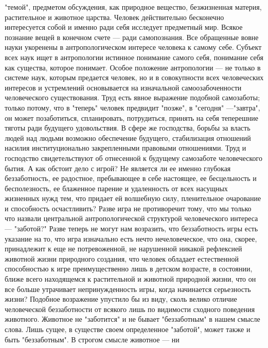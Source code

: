 \documentclass[12pt]{article}
\begin{document}
"темой", предметом обсуждения, как природное вещество, безжизненная материя, растительное и животное  
царства. Человек действительно бесконечно интересуется собой и именно ради себя исследует предметный мир.
Всякое познание вещей в конечном счете --- ради самопознания. Все обращенные вовне науки укоренены в
антропологическом  интересе  человека  к  самому  себе.  Субъект  всех  наук  ищет  в  антропологии  истинное
понимание самого себя, понимание себя как существа, которое понимает. Особое положение антропологии --- не
только  в  системе  наук,  которым  предается  человек,  но  и  в  совокупности  всех  человеческих  интересов  и
устремлений основывается на изначальной самоозабоченности человеческого существования. Труд есть явное
выражение подобной самозаботы; только потому, что в "теперь" человек предвидит "позже", в "сегодня" ---"завтра", он может позаботиться, спланировать, потрудиться, принять на себя теперешние тяготы ради будущего
удовольствия. В сфере же господства, борьбы за власть людей над людьми возможно обеспечение будущего,
стабилизация  отношений  насилия  институционально  закрепленными  правовыми  отношениями.  Труд  и
господство свидетельствуют об отнесенной к будущему самозаботе человеческого бытия.
А как обстоит дело с игрой? Не является ли ее именно глубокая беззаботность, ее радостное, пребывающее в
себе настоящее, ее бесцельность и бесполезность, ее блаженное парение и удаленность от всех насущных
жизненных нужд тем, что придает ей волшебную силу, пленительное очарование и способность осчастливить?
Разве  игра  не  противоречит  тому,  что  мы  только  что  назвали  центральной  антропологической  структурой
человеческого  интереса  ---  "заботой?"  Разве  теперь  не  могут  нам  возразить,  что  беззаботность  игры  есть
указание  на  то,  что  игра  изначально  есть  нечто  нечеловеческое,  что  она,  скорее,  принадлежит  к  еще  не
потревоженной,  не  нарушенной  никакой  рефлексией  животной  жизни  природного  создания,  что  человек
обладает естественной способностью к игре преимущественно лишь в детском возрасте, в состоянии, ближе
всего  находящемся  к  растительной  и  животной  природной  жизни,  что  он  все  больше  утрачивает
непринужденность игры, когда начинается серьезность жизни? Подобное возражение упустило бы из виду,
сколь  велико  отличие  человеческой  беззаботности  от  всякого  лишь  по  видимости  сходного  поведения
животного.  Животное  не  "заботится"  и  не  бывает  "беззаботным"  в  нашем  смысле  слова.  Лишь  сущее,  в
существе своем определенное "заботой", может также и быть "беззаботным". В строгом смысле животное --- ни
\end{document}
